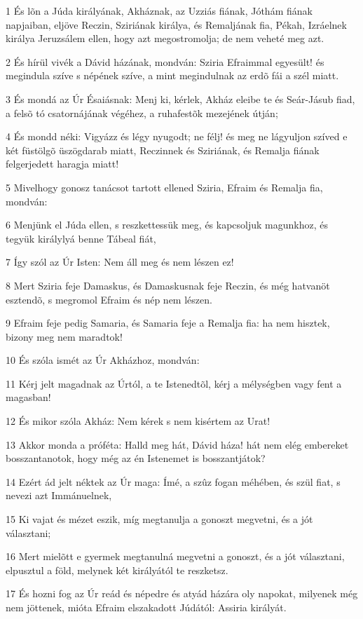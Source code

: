 \par 1 És lõn a Júda királyának, Akháznak, az Uzziás fiának, Jóthám fiának napjaiban, eljöve Reczin, Sziriának királya, és Remaljának fia, Pékah, Izráelnek királya Jeruzsálem ellen, hogy azt megostromolja; de nem veheté meg azt.
\par 2 És hírül vivék a Dávid házának, mondván: Sziria Efraimmal egyesült! és megindula szíve s népének szíve, a mint megindulnak az erdõ fái a szél miatt.
\par 3 És mondá az Úr Ésaiásnak: Menj ki, kérlek, Akház eleibe te és Seár-Jásub fiad, a felsõ tó csatornájának végéhez, a ruhafestõk mezejének útján;
\par 4 És mondd néki: Vigyázz és légy nyugodt; ne félj! és meg ne lágyuljon szíved e két füstölgõ üszögdarab miatt, Reczinnek és Sziriának, és Remalja fiának felgerjedett haragja miatt!
\par 5 Mivelhogy gonosz tanácsot tartott ellened Sziria, Efraim és Remalja fia, mondván:
\par 6 Menjünk el Júda ellen, s reszkettessük meg, és kapcsoljuk magunkhoz, és tegyük királylyá benne Tábeal fiát,
\par 7 Így szól az Úr Isten: Nem áll meg és nem lészen ez!
\par 8 Mert Sziria feje Damaskus, és Damaskusnak feje Reczin, és még hatvanöt esztendõ, s megromol Efraim és nép nem lészen.
\par 9 Efraim feje pedig Samaria, és Samaria feje a Remalja fia: ha nem hisztek, bizony meg nem maradtok!
\par 10 És szóla ismét az Úr Akházhoz, mondván:
\par 11 Kérj jelt magadnak az Úrtól, a te Istenedtõl, kérj a mélységben vagy fent a magasban!
\par 12 És mikor szóla Akház: Nem kérek s nem kisértem az Urat!
\par 13 Akkor monda a próféta: Halld meg hát, Dávid háza! hát nem elég embereket bosszantanotok, hogy még az én Istenemet is bosszantjátok?
\par 14 Ezért ád jelt néktek az Úr maga: Ímé, a szûz fogan méhében, és szül fiat, s nevezi azt Immánuelnek,
\par 15 Ki vajat és mézet eszik, míg megtanulja a gonoszt megvetni, és a jót választani;
\par 16 Mert mielõtt e gyermek megtanulná megvetni a gonoszt, és a jót választani, elpusztul a föld, melynek két királyától te reszketsz.
\par 17 És hozni fog az Úr reád és népedre és atyád házára oly napokat, milyenek még nem jöttenek, mióta Efraim elszakadott Júdától: Assiria királyát.

